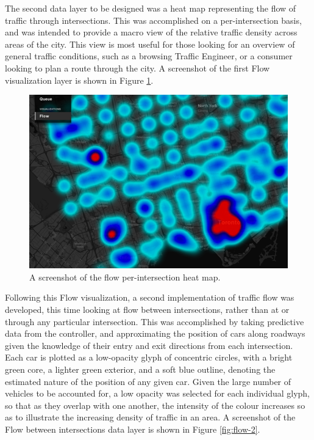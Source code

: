 \documentclass{report}
\begin{document}
The second data layer to be designed was a heat map representing the flow of traffic through intersections.
This was accomplished on a per-intersection basis, and was intended to provide a macro view of the relative traffic density across areas of the city.
This view is most useful for those looking for an overview of general traffic conditions, such as a browsing Traffic Engineer, or a consumer looking to plan a route through the city.
A screenshot of the first Flow visualization layer is shown in Figure \ref{fig:flow-1}.

\begin{figure}[htbp!]
  \begin{centering}
    \includegraphics[scale=0.9]{figures/flow-1.png}
    \caption{A screenshot of the flow per-intersection heat map.}
    \label{fig:flow-1}
  \end{centering}
\end{figure}

Following this Flow visualization, a second implementation of traffic flow was developed, this time looking at flow between intersections, rather than at or through any particular intersection.
This was accomplished by taking predictive data from the controller, and approximating the position of cars along roadways given the knowledge of their entry and exit directions from each intersection.
Each car is plotted as a low-opacity glyph of concentric circles, with a bright green core, a lighter green exterior, and a soft blue outline, denoting the estimated nature of the position of any given car.
Given the large number of vehicles to be accounted for, a low opacity was selected for each individual glyph, so that as they overlap with one another, the intensity of the colour increases so as to illustrate the increasing density of traffic in an area.
A screenshot of the Flow between intersections data layer is shown in Figure \ref{fig:flow-2}.
\end{document}
